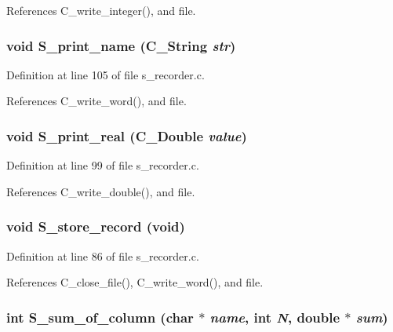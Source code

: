 References C\_\-write\_\-integer(), and file.
\subsubsection{\setlength{\rightskip}{0pt plus 5cm}void S\_\-print\_\-name (\bf{C\_\-String} {\em str})}\label{s__recorder_8c_ea51083896ed8f95838e4af5905999ff}




Definition at line 105 of file s\_\-recorder.c.

References C\_\-write\_\-word(), and file.
\subsubsection{\setlength{\rightskip}{0pt plus 5cm}void S\_\-print\_\-real (\bf{C\_\-Double} {\em value})}\label{s__recorder_8c_a9425f58022c0f66db9ecf39058a82eb}




Definition at line 99 of file s\_\-recorder.c.

References C\_\-write\_\-double(), and file.
\subsubsection{\setlength{\rightskip}{0pt plus 5cm}void S\_\-store\_\-record (void)}\label{s__recorder_8c_2a43630b327230b1af12da50ac4c691b}




Definition at line 86 of file s\_\-recorder.c.

References C\_\-close\_\-file(), C\_\-write\_\-word(), and file.
\subsubsection{\setlength{\rightskip}{0pt plus 5cm}int S\_\-sum\_\-of\_\-column (char $\ast$ {\em name}, int {\em N}, double $\ast$ {\em sum})}\label{s__recorder_8c_4a73f9a37da2e92c5f115760cd4ee599}




